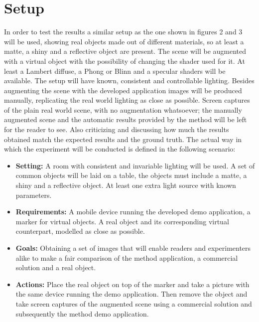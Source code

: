 \section{Setup}
In order to test the results a similar setup as the one shown in figures 2 and 3 will be used, showing real objects made out of different materials, so at least a matte, a shiny and a reflective object are present. The scene will be augmented with a virtual object with the possibility of changing the shader used for it. At least a Lambert diffuse, a Phong or Blinn and a specular shaders will be available. The setup will have known,  consistent and controllable lighting.\newline
Besides augmenting the scene with the developed application images will be produced manually, replicating the real world lighting as close as possible. Screen captures of the plain real world scene, with no augmentation whatsoever; the manually augmented scene and the automatic results provided by the method will be left for the reader to see. Also criticizing and discussing how much the results obtained match the expected results and the ground truth.\newline
The actual way in which the experiment will be conducted is defined in the following scenario:
\begin{itemize}
    \item \textbf{Setting:} A room with consistent and invariable lighting will be used. A set of common objects will be laid on a table, the objects must include a matte, a shiny and a reflective object. At least one extra light source with known parameters.
    \item \textbf{Requirements:} A mobile device running the developed demo application, a marker for virtual objects. A real object and its corresponding virtual counterpart, modelled as close as possible. 
    \item \textbf{Goals:} Obtaining a set of images that will enable readers and experimenters alike to make a fair comparison of the method application, a commercial solution and a real object.
    \item \textbf{Actions:} Place the real object on top of the marker and take a picture with the same device running the demo application. Then remove the object and take screen captures of the augmented scene using a commercial solution and subsequently the method demo application.
\end{itemize}

